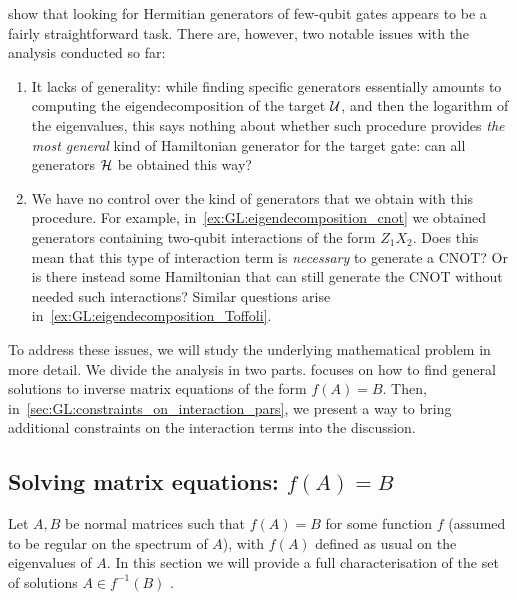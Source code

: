  show that looking for Hermitian generators of few-qubit gates appears to be a fairly straightforward task. There are, however, two notable issues with the analysis conducted so far:
\begin{enumerate}
    \item It lacks of generality: while finding specific generators essentially amounts to computing the eigendecomposition of the target ${\mathcal{U}}$, and then the logarithm of the eigenvalues, this says nothing about whether such procedure provides \emph{the most general} kind of Hamiltonian generator for the target gate: can all generators ${\mathcal{H}}$ be obtained this way?
    \item We have no control over the kind of generators that we obtain with this procedure. For example, in~\cref{ex:GL:eigendecomposition_cnot} we obtained generators containing two-qubit interactions of the form $Z_1 X_2$. Does this mean that this type of interaction term is \textit{necessary} to generate a CNOT? Or is there instead some Hamiltonian that can still generate the CNOT without needed such interactions?
    Similar questions arise in~\cref{ex:GL:eigendecomposition_Toffoli}.
\end{enumerate}

To address these issues, we will study the underlying mathematical problem in more detail.
We divide the analysis in two parts.  focuses on how to find general solutions to inverse matrix equations of the form $f(A)=B$. Then, in~\cref{sec:GL:constraints_on_interaction_pars}, we present a way to bring additional constraints on the interaction terms into the discussion.

\subsection{Solving matrix equations: \texorpdfstring{$f(A)=B$}{f(A)=B}}
\label{sec:GL:solutions_matrix_equation_f(A)=B}

Let $A,B$ be normal matrices such that $f(A)=B$ for some function $f$ (assumed to be regular on the spectrum of $A$), with $f(A)$ defined as usual on the eigenvalues of $A$.
In this section we will provide a full characterisation of the set of solutions $A\in f^{-1}(B)$ .

